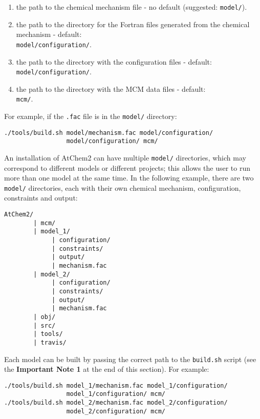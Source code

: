 \begin{enumerate}
\item the path to the chemical mechanism file - no default (suggested:
  \texttt{model/}).
\item the path to the directory for the Fortran files generated from
  the chemical mechanism - default:\\ \texttt{model/configuration/}.
\item the path to the directory with the configuration files -
  default:\\ \texttt{model/configuration/}.
\item the path to the directory with the MCM data files - default:\\
  \texttt{mcm/}.
\end{enumerate}

For example, if the \texttt{.fac} file is in the \texttt{model/}
directory:

\begin{verbatim}
./tools/build.sh model/mechanism.fac model/configuration/
                 model/configuration/ mcm/
\end{verbatim}

An installation of AtChem2 can have multiple \texttt{model/}
directories, which may correspond to different models or different
projects; this allows the user to run more than one model at the same
time. In the following example, there are two \texttt{model/}
directories, each with their own chemical mechanism, configuration,
constraints and output:

\begin{verbatim}
AtChem2/
        | mcm/
        | model_1/
             | configuration/
             | constraints/
             | output/
             | mechanism.fac
        | model_2/
             | configuration/
             | constraints/
             | output/
             | mechanism.fac
        | obj/
        | src/
        | tools/
        | travis/
\end{verbatim}

Each model can be built by passing the correct path to the
\texttt{build.sh} script (see the \textbf{Important Note 1} at the end
of this section). For example:

\begin{verbatim}
./tools/build.sh model_1/mechanism.fac model_1/configuration/
                 model_1/configuration/ mcm/
./tools/build.sh model_2/mechanism.fac model_2/configuration/
                 model_2/configuration/ mcm/
\end{verbatim}


